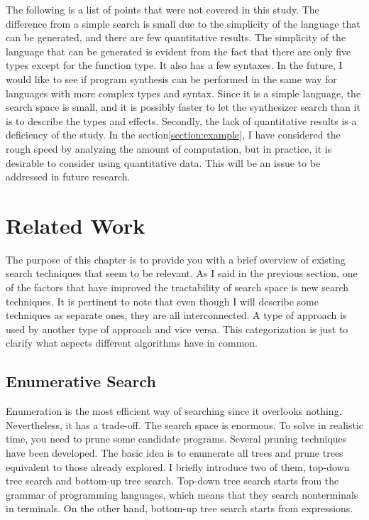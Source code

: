 \documentclass[12pt, a4paper, titlepage]{report}
\begin{document}
  The following is a list of points that were not covered in this study.
  The difference from a simple search is small due to the simplicity of the language that can be generated, and there are few quantitative results.
  The simplicity of the language that can be generated is evident from the fact that there are only five types except for the function type.
  It also has a few syntaxes.
  In the future, I would like to see if program synthesis can be performed in the same way for languages with more complex types and syntax.
  Since it is a simple language, the search space is small, and it is possibly faster to let the synthesizer search than it is to describe the types and effects.
  Secondly, the lack of quantitative results is a deficiency of the study.
  In the section\ref{section:example}, I have considered the rough speed by analyzing the amount of computation, but in practice, it is desirable to consider using quantitative data.
  This will be an issue to be addressed in future research.

\chapter{Related Work}\label{chapter:relatedWork}
  The purpose of this chapter is to provide you with a brief overview of existing search techniques that seem to be relevant. As I said in the previous section, one of the factors that have improved the tractability of search space is new search techniques.
  It is pertinent to note that even though I will describe some techniques as separate ones, they are all interconnected. A type of approach is used by another type of approach and vice versa. This categorization is just to clarify what aspects different algorithms have in common.

  \section{Enumerative Search}
  Enumeration is the most efficient way of searching since it overlooks nothing.
  Nevertheless, it has a trade-off.
  The search space is enormous.
  To solve in realistic time, you need to prune some candidate programs.
  Several pruning techniques have been developed.
  The basic idea is to enumerate all trees and prune trees equivalent to those already explored.
  I briefly introduce two of them, top-down tree search and bottom-up tree search.
  Top-down tree search starts from the grammar of programming languages, which means that they search nonterminals in terminals.
  On the other hand, bottom-up tree search starts from expressions.
\end{document}

